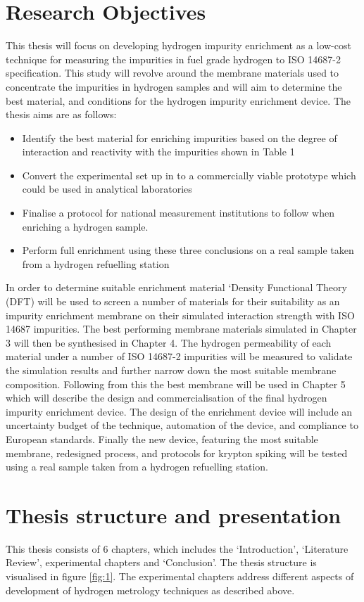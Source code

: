 \section{Research Objectives}
This thesis will focus on developing hydrogen impurity enrichment as a low-cost technique for measuring 
the impurities in fuel grade hydrogen to ISO 14687-2 specification. 
This study will revolve around the membrane materials used to concentrate the impurities in hydrogen samples 
and will aim to determine the best material, and conditions for the hydrogen impurity enrichment device. 
The thesis aims are as follows:
\begin{itemize}
\item Identify the best material for enriching impurities based on the degree of interaction and reactivity with the impurities shown in Table 1 
\item Convert the experimental set up in to a commercially viable prototype which could be used in analytical laboratories
\item Finalise a protocol for national measurement institutions to follow when enriching a hydrogen sample. 
\item Perform full enrichment using these three conclusions on a real sample taken from a hydrogen refuelling station
\end{itemize}
In order to determine suitable enrichment material ‘Density Functional Theory (DFT) will be used to screen 
a number of materials for their suitability as an impurity enrichment membrane on their simulated 
interaction strength with ISO 14687 impurities. 
The best performing membrane materials simulated in Chapter 3 will then be synthesised in Chapter 4. 
The hydrogen permeability of each material under a number of ISO 14687-2 impurities will be measured to 
validate the simulation results and further narrow down the most suitable membrane composition. 
Following from this the best membrane will be used in Chapter 5 which will describe the design and 
commercialisation of the final hydrogen impurity enrichment device. The design of the enrichment device 
will include an uncertainty budget of the technique, automation of the device, and compliance to European 
standards.
Finally the new device, featuring the most suitable membrane, redesigned process, and protocols for krypton 
spiking will be tested using a real sample taken from a hydrogen refuelling station.


\section{Thesis structure and presentation}
This thesis consists of 6 chapters, which includes the ‘Introduction’, ‘Literature Review’, 
experimental chapters and ‘Conclusion’. The thesis structure is visualised in figure \ref{fig:1}. 
The experimental chapters address different aspects of development of hydrogen metrology techniques as 
described above. 


